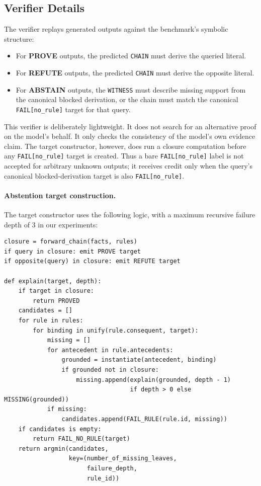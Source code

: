\subsection{Verifier Details}

The verifier replays generated outputs against the benchmark's symbolic structure:
\begin{itemize}
\item For \textbf{PROVE} outputs, the predicted \texttt{CHAIN} must derive the queried literal.
\item For \textbf{REFUTE} outputs, the predicted \texttt{CHAIN} must derive the opposite literal.
\item For \textbf{ABSTAIN} outputs, the \texttt{WITNESS} must describe missing support from the canonical blocked derivation, or the chain must match the canonical \texttt{FAIL[no\_rule]} target for that query.
\end{itemize}

This verifier is deliberately lightweight. It does not search for an alternative proof on the model's behalf. It only checks the consistency of the model's own evidence claim. The target constructor, however, does run a closure computation before any \texttt{FAIL[no\_rule]} target is created. Thus a bare \texttt{FAIL[no\_rule]} label is not accepted for arbitrary unknown outputs; it receives credit only when the query's canonical blocked-derivation target is also \texttt{FAIL[no\_rule]}.

\paragraph{Abstention target construction.}
The target constructor uses the following logic, with a maximum recursive
failure depth of 3 in our experiments:
\begin{verbatim}
closure = forward_chain(facts, rules)
if query in closure: emit PROVE target
if opposite(query) in closure: emit REFUTE target

def explain(target, depth):
    if target in closure:
        return PROVED
    candidates = []
    for rule in rules:
        for binding in unify(rule.consequent, target):
            missing = []
            for antecedent in rule.antecedents:
                grounded = instantiate(antecedent, binding)
                if grounded not in closure:
                    missing.append(explain(grounded, depth - 1)
                                   if depth > 0 else MISSING(grounded))
            if missing:
                candidates.append(FAIL_RULE(rule.id, missing))
    if candidates is empty:
        return FAIL_NO_RULE(target)
    return argmin(candidates,
                  key=(number_of_missing_leaves,
                       failure_depth,
                       rule_id))
\end{verbatim}

